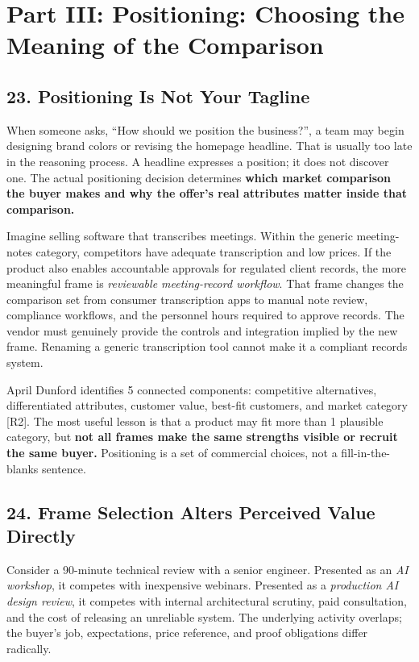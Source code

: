 \section*{Part III: Positioning: Choosing the Meaning of the Comparison}

\subsection*{23. Positioning Is Not Your Tagline}

When someone asks, ``How should we position the business?'', a team may begin designing brand colors or revising the homepage headline. That is usually too late in the reasoning process. A headline expresses a position; it does not discover one. The actual positioning decision determines \textbf{which market comparison the buyer makes and why the offer's real attributes matter inside that comparison.}

Imagine selling software that transcribes meetings. Within the generic meeting-notes category, competitors have adequate transcription and low prices. If the product also enables accountable approvals for regulated client records, the more meaningful frame is \emph{reviewable meeting-record workflow}. That frame changes the comparison set from consumer transcription apps to manual note review, compliance workflows, and the personnel hours required to approve records. The vendor must genuinely provide the controls and integration implied by the new frame. Renaming a generic transcription tool cannot make it a compliant records system.

April Dunford identifies 5 connected components: competitive alternatives, differentiated attributes, customer value, best-fit customers, and market category [R2]. The most useful lesson is that a product may fit more than 1 plausible category, but \textbf{not all frames make the same strengths visible or recruit the same buyer.} Positioning is a set of commercial choices, not a fill-in-the-blanks sentence.

\subsection*{24. Frame Selection Alters Perceived Value Directly}

Consider a 90-minute technical review with a senior engineer. Presented as an \emph{AI workshop}, it competes with inexpensive webinars. Presented as a \emph{production AI design review}, it competes with internal architectural scrutiny, paid consultation, and the cost of releasing an unreliable system. The underlying activity overlaps; the buyer's job, expectations, price reference, and proof obligations differ radically.

